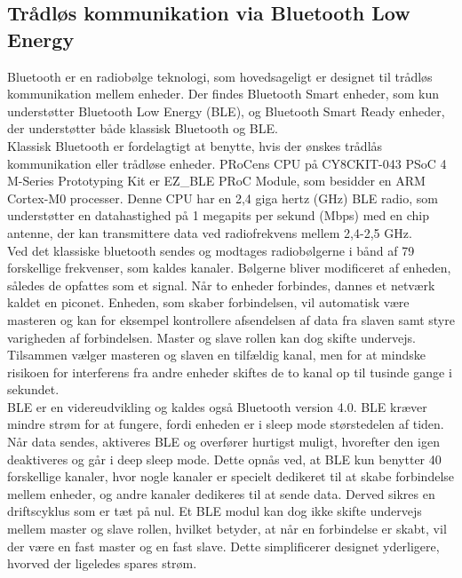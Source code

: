 \subsection{Trådløs kommunikation via Bluetooth Low Energy} 
Bluetooth er en radiobølge teknologi, som hovedsageligt er designet til trådløs kommunikation mellem enheder. Der findes Bluetooth Smart enheder, som kun understøtter Bluetooth Low Energy (BLE), og Bluetooth Smart Ready enheder, der understøtter både klassisk Bluetooth og BLE. \\
Klassisk Bluetooth er fordelagtigt at benytte, hvis der ønskes trådlås kommunikation eller trådløse enheder. PRoCens CPU på CY8CKIT-043 PSoC 4 M-Series Prototyping Kit er EZ\_BLE PRoC Module, som besidder en ARM Cortex-M0 processer. %
Denne CPU har en 2,4 giga hertz (GHz) BLE radio, som understøtter en datahastighed på 1 megapits per sekund (Mbps) med en chip antenne, der kan transmittere data ved radiofrekvens mellem 2,4-2,5 GHz. %
\citep{Semiconductor2016PRoC,Semiconductor2016BLEdyb}\\
Ved det klassiske bluetooth sendes og modtages radiobølgerne i bånd af 79 forskellige frekvenser, som kaldes kanaler. Bølgerne bliver modificeret af enheden, således de opfattes som et signal. Når to enheder forbindes, dannes et netværk kaldet en piconet. Enheden, som skaber forbindelsen, vil automatisk være masteren og kan for eksempel kontrollere afsendelsen af data fra slaven samt styre varigheden af forbindelsen. Master og slave rollen kan dog skifte undervejs. Tilsammen vælger masteren og slaven en tilfældig kanal, men for at mindske risikoen for interferens fra andre enheder skiftes de to kanal op til tusinde gange i sekundet. \citep{CYPRESS2016workshopBLE,Sauter2011} \\
BLE er en videreudvikling og kaldes også Bluetooth version 4.0. BLE kræver mindre strøm for at fungere, fordi enheden er i sleep mode størstedelen af tiden. Når data sendes, aktiveres BLE og overfører hurtigst muligt, hvorefter den igen deaktiveres og går i deep sleep mode. Dette opnås ved, at BLE kun benytter 40 forskellige kanaler, hvor nogle kanaler er specielt dedikeret til at skabe forbindelse mellem enheder, og andre kanaler dedikeres til at sende data. Derved sikres en driftscyklus som er tæt på nul. Et BLE modul kan dog ikke skifte undervejs mellem master og slave rollen, hvilket betyder, at når en forbindelse er skabt, vil der være en fast master og en fast slave. Dette simplificerer designet yderligere, hvorved der ligeledes spares strøm. \citep{Gupta2013}